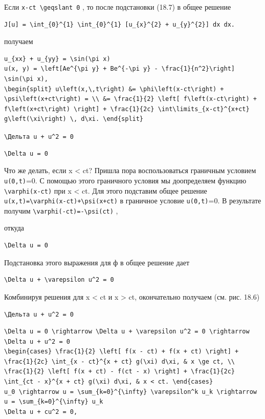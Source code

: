 \documentclass[
  ukrainian,
]{article}
\begin{document}
Если \texttt{x-ct\ \textbackslash{}geqslant\ 0} , то после подстановки
(18.7) в общее решение

\begin{verbatim}
J[u] = \int_{0}^{1} \int_{0}^{1} [u_{x}^{2} + u_{y}^{2}] dx dx.
\end{verbatim}

получаем

\begin{verbatim}
u_{xx} + u_{yy} = \sin(\pi x)
u(x, y) = \left[Ae^{\pi y} + Be^{-\pi y} - \frac{1}{n^2}\right] \sin(\pi x),
\begin{split} u\left(x,\,t\right) &= \phi\left(x-ct\right) + \psi\left(x+ct\right) = \\ &= \frac{1}{2} \left[ f\left(x-ct\right) + f\left(x+ct\right) \right] + \frac{1}{2c} \int\limits_{x-ct}^{x+ct} g\left(\xi\right) \, d\xi. \end{split}
\end{verbatim}

\texttt{\textbackslash{}Дельта\ u\ +\ u\^{}2\ =\ 0}

\begin{verbatim}
\Delta u = 0
\end{verbatim}

Что же делать, если x \textless{} ct? Пришла пора воспользоваться
граничным условием \texttt{u(0,t)}=0. С помощью этого граничного условия
мы доопределяем функцию \texttt{\textbackslash{}varphi(x-ct)} при x
\textless{} ct. Для этого подставим общее решение
\texttt{u(x,t)=\textbackslash{}varphi(x-ct)+\textbackslash{}psi(x+ct)} в
граничное условие \texttt{u(0,t)}=0. В результате получим
\texttt{\textbackslash{}varphi(-ct)=-\textbackslash{}psi(ct)} ,

откуда

\begin{verbatim}
\Delta u = 0
\end{verbatim}

Подстановка этого выражения для ф в общее решение дает

\begin{verbatim}
\Delta u + \varepsilon u^2 = 0
\end{verbatim}

Комбинируя решения для x \textless{} ct и x \textgreater{} ct,
окончательно получаем (см. рис. 18.6)

\texttt{\textbackslash{}Дельта\ u\ +\ u\^{}2\ =\ 0}

\begin{verbatim}
\Delta u = 0 \rightarrow \Delta u + \varepsilon u^2 = 0 \rightarrow \Delta u + u^2 = 0
\begin{cases} \frac{1}{2} \left[ f(x - ct) + f(x + ct) \right] + \frac{1}{2c} \int_{x - ct}^{x + ct} g(\xi) d\xi, & x \ge ct, \\ \frac{1}{2} \left[ f(x + ct) - f(ct - x) \right] + \frac{1}{2c} \int_{ct - x}^{x + ct} g(\xi) d\xi, & x < ct. \end{cases}
u_0 \rightarrow u = \sum_{k=0}^{\infty} \varepsilon^k u_k \rightarrow u = \sum_{k=0}^{\infty} u_k
\Delta u + cu^2 = 0,
\end{verbatim}
\end{document}
